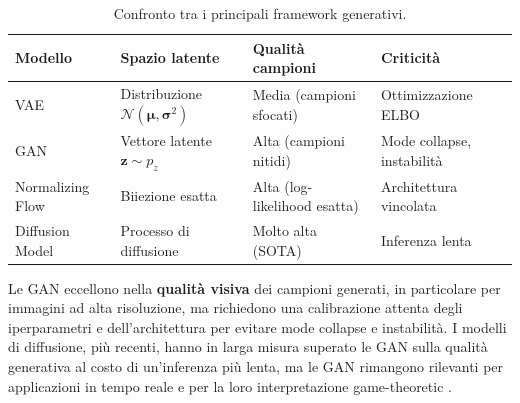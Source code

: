\begin{table}[H]
  \centering
  \caption{Confronto tra i principali framework generativi.}
  \label{tab:gen-comparison}
  \small
  \begin{tabularx}{\linewidth}{l X X X}
    \toprule
    \textbf{Modello} & \textbf{Spazio latente}
      & \textbf{Qualità campioni} & \textbf{Criticità} \\
    \midrule
    VAE              & Distribuzione $\mathcal{N}(\boldsymbol{\mu}, \boldsymbol{\sigma}^2)$ & Media (campioni sfocati)    & Ottimizzazione ELBO \\
    GAN              & Vettore latente $\mathbf{z} \sim p_z$                               & Alta (campioni nitidi)      & Mode collapse, instabilità \\
    Normalizing Flow & Biiezione esatta                                                     & Alta (log-likelihood esatta)& Architettura vincolata \\
    Diffusion Model  & Processo di diffusione                                               & Molto alta (SOTA)           & Inferenza lenta \\
    \bottomrule
  \end{tabularx}
\end{table}

Le GAN eccellono nella \textbf{qualità visiva} dei campioni generati,
in particolare per immagini ad alta risoluzione, ma richiedono una
calibrazione attenta degli iperparametri e dell'architettura per evitare
mode collapse e instabilità. I modelli di diffusione, più recenti, hanno
in larga misura superato le GAN sulla qualità generativa al costo di
un'inferenza più lenta, ma le GAN rimangono rilevanti per applicazioni
in tempo reale e per la loro interpretazione game-theoretic
\citep{bishop2024}.

